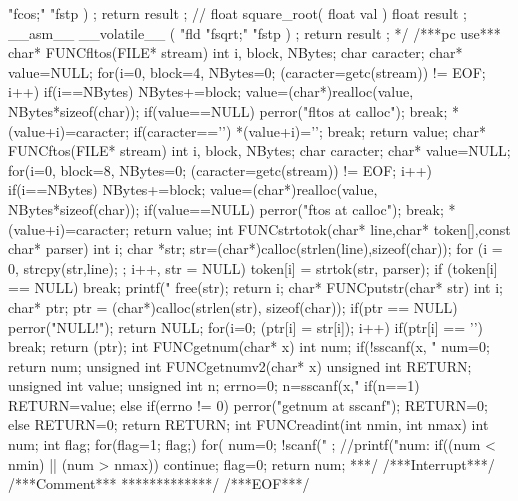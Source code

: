 \begin{verbatimtab}
{"fcos;"
"fstp %
) ;
return result ;
}
//
float square_root( float val ) {
float result ;
__asm__ __volatile__ ( "fld %
"fsqrt;"
"fstp %
) ;
return result ;
}
*/
/***pc use***
char* FUNCfltos(FILE* stream)
{
int i, block, NBytes;
char caracter;
char* value=NULL;
for(i=0, block=4, NBytes=0; (caracter=getc(stream)) != EOF; i++){
	if(i==NBytes){
		NBytes+=block;
		value=(char*)realloc(value, NBytes*sizeof(char));
		if(value==NULL){
			perror("fltos at calloc");
			break;
		}
	}
	*(value+i)=caracter;
	if(caracter=='\n'){
		*(value+i)='\0';
		break;
	}
}
return value;
}
char* FUNCftos(FILE* stream)
{
int i, block, NBytes;
char caracter;
char* value=NULL;
for(i=0, block=8, NBytes=0; (caracter=getc(stream)) != EOF; i++){
	if(i==NBytes){
		NBytes+=block;
		value=(char*)realloc(value, NBytes*sizeof(char));
		if(value==NULL){
			perror("ftos at calloc");
			break;
		}
	}
	*(value+i)=caracter;
}
return value;
}
int FUNCstrtotok(char* line,char* token[],const char* parser)
{
int i;
char *str;
str=(char*)calloc(strlen(line),sizeof(char));
for (i = 0, strcpy(str,line); ; i++, str = NULL) {
	token[i] = strtok(str, parser);
	if (token[i] == NULL)
	break;
	printf("%
}
free(str);
return i;
}
char* FUNCputstr(char* str)
{
int i; char* ptr;
ptr = (char*)calloc(strlen(str), sizeof(char));
if(ptr == NULL){
	perror("NULL!\n");
	return NULL;
}
for(i=0; (ptr[i] = str[i]); i++){
	if(ptr[i] == '\0')
	break;
}
return (ptr);
}
int FUNCgetnum(char* x)
{
int num;
if(!sscanf(x, "%
num=0;
return num;
}
unsigned int FUNCgetnumv2(char* x)
{
unsigned int RETURN;
unsigned int value;
unsigned int n;
errno=0;
n=sscanf(x,"%
if(n==1){
	RETURN=value;
}else if(errno != 0){
	perror("getnum at sscanf");
	RETURN=0;
}else{
	RETURN=0;
}
return RETURN;
}
int FUNCreadint(int nmin, int nmax)
{
int num;
int flag;
for(flag=1; flag;){
	for( num=0; !scanf("%
	;
	//printf("num: %
	if((num < nmin) || (num > nmax))
	continue;
	flag=0;
}
return num;
}
***/
/***Interrupt***/
/***Comment***
*************/
/***EOF***/
\end{verbatimtab}